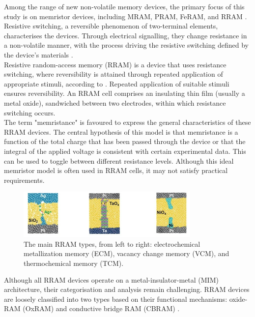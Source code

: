 \noindent Among the range of new non-volatile memory devices, the primary focus of this study is on memristor devices, including MRAM, PRAM, FeRAM, and RRAM \cite{wang2017memristors}. Resistive switching, a reversible phenomenon of two-terminal elements, characterises the devices. Through electrical signalling, they change resistance in a non-volatile manner, with the process driving the resistive switching defined by the device's materials \cite{mehonic2018silicon}. \\

\noindent Resistive random-access memory (RRAM) is a device that uses resistance switching, where reversibility is attained through repeated application of appropriate stimuli, according to \cite{liu2010controllable}. Repeated application of suitable stimuli ensures reversibility. An RRAM cell comprises an insulating thin film (usually a metal oxide), sandwiched between two electrodes, within which resistance switching occurs. \\

\noindent The term "memristance" is favoured to express the general characteristics of these RRAM devices. The central hypothesis of this model is that memristance is a function of the total charge that has been passed through the device or that the integral of the applied voltage is consistent with certain experimental data. This can be used to toggle between different resistance levels. Although this ideal memristor model is often used in RRAM cells, it may not satisfy practical requirements. \\

\begin{figure}[htbp!] 
    \centering    
    \includegraphics[width=0.8\textwidth]{Chapter2/Figs/g.png}
    \caption[The main RRAM types.]{The main RRAM types, from left to right: electrochemical metallization memory (ECM), vacancy change memory (VCM), and thermochemical memory (TCM). \cite{goux2016electrochemical}}
    \label{fig:2g}
\end{figure} 

\noindent Although all RRAM devices operate on a metal-insulator-metal (MIM) architecture, their categorisation and analysis remain challenging. RRAM devices are loosely classified into two types based on their functional mechanisms: oxide-RAM (OxRAM) and conductive bridge RAM (CBRAM) \cite{liu2015categorization}. \\


